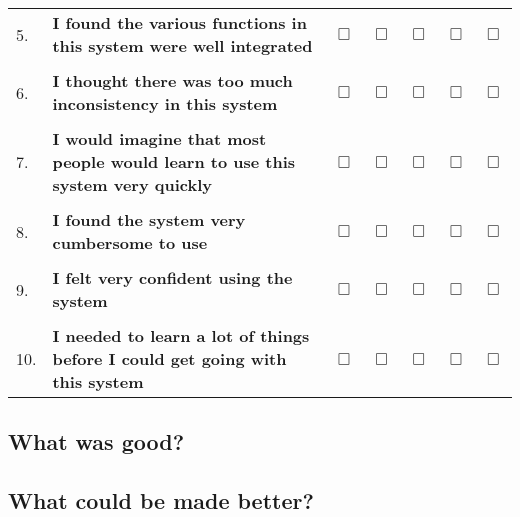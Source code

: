 \documentclass[a4paper,10pt]{article}
\def\MBox{\Large\ensuremath{\Box}}
\begin{document}
\begin{center}
\begin{tabu}{l X S S S S S}
5.  &\textbf{I found the various functions in this system were well integrated}\dotfill                         & \MBox                                          & \MBox & \MBox & \MBox & \MBox\\
    &                                                                                                           &                                                &       &       &       & \\
6.  &\textbf{I thought there was too much inconsistency in this system}\dotfill                                 & \MBox                                          & \MBox & \MBox & \MBox & \MBox\\
    &                                                                                                           &                                                &       &       &       & \\
7.  &\textbf{I would imagine that most people would learn to use this system very quickly}\dotfill              & \MBox                                          & \MBox & \MBox & \MBox & \MBox\\
    &                                                                                                           &                                                &       &       &       & \\
8.  &\textbf{I found the system very cumbersome to use}\dotfill                                                 & \MBox                                          & \MBox & \MBox & \MBox & \MBox\\
    &                                                                                                           &                                                &       &       &       & \\
9.  &\textbf{I felt very confident using the system}\dotfill                                                    & \MBox                                          & \MBox & \MBox & \MBox & \MBox\\
    &                                                                                                           &                                                &       &       &       & \\
10. &\textbf{I needed to learn a lot of things before I could get going with this system}\dotfill               & \MBox                                          & \MBox & \MBox & \MBox & \MBox\\
\end{tabu}%
\end{center}

\bigskip
\subsection*{What was good?}
\vfill
\subsection*{What could be made better?}
\vfill
\vfill
\end{document}
